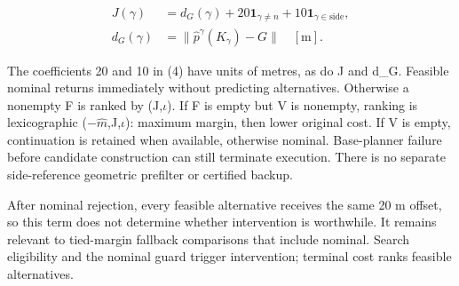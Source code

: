 \documentclass[conference]{IEEEtran}
\begin{document}
\begin{equation}\label{eq:4}
\begin{aligned}J(\gamma)&=d_G(\gamma)+20\mathbf{1}_{\gamma\ne n}+10\mathbf{1}_{\gamma\in\mathrm{side}},\\d_G(\gamma)&=\|\hat p^\gamma(K_\gamma)-G\|\quad[\mathrm m].\end{aligned}
\end{equation}

The coefficients 20 and 10 in (4) have units of metres, as do J and d\_G. Feasible nominal returns immediately without predicting alternatives. Otherwise a nonempty F is ranked by (J,\ensuremath{\iota}). If F is empty but V is nonempty, ranking is lexicographic (\ensuremath{-}$\hat m$,J,\ensuremath{\iota}): maximum margin, then lower original cost. If V is empty, continuation is retained when available, otherwise nominal. Base-planner failure before candidate construction can still terminate execution. There is no separate side-reference geometric prefilter or certified backup.

After nominal rejection, every feasible alternative receives the same 20 m offset, so this term does not determine whether intervention is worthwhile. It remains relevant to tied-margin fallback comparisons that include nominal. Search eligibility and the nominal guard trigger intervention; terminal cost ranks feasible alternatives.
\end{document}
